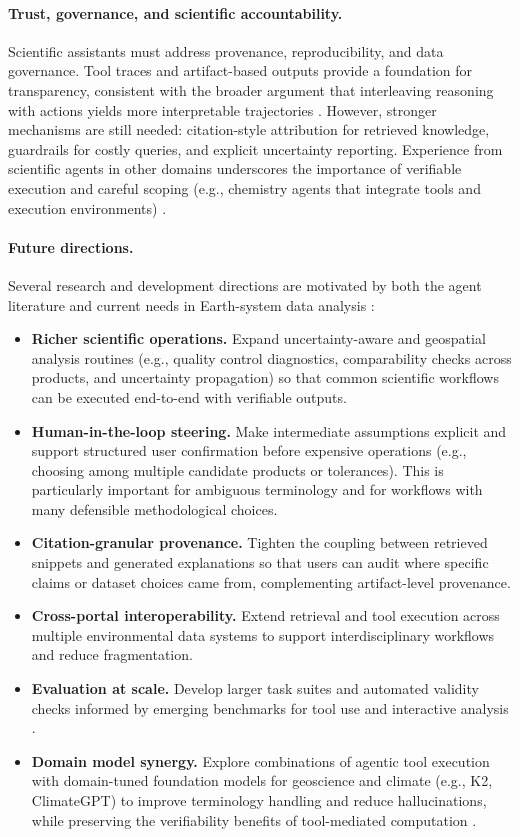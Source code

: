 \paragraph{Trust, governance, and scientific accountability.}
Scientific assistants must address provenance, reproducibility, and data governance.
Tool traces and artifact-based outputs provide a foundation for transparency, consistent with the broader argument that interleaving reasoning with actions yields more interpretable trajectories \citep{Yao2022ReAct}.
However, stronger mechanisms are still needed: citation-style attribution for retrieved knowledge, guardrails for costly queries, and explicit uncertainty reporting.
Experience from scientific agents in other domains underscores the importance of verifiable execution and careful scoping (e.g., chemistry agents that integrate tools and execution environments) \citep{Bran2024ChemCrow,Boiko2023Coscientist}.

\paragraph{Future directions.}
Several research and development directions are motivated by both the agent literature \citep{Luo2025LLMAgentSurvey} and current needs in Earth-system data analysis \citep{Zhao2024AIforGeoscience}:
\begin{itemize}[leftmargin=*]
  \item \textbf{Richer scientific operations.} Expand uncertainty-aware and geospatial analysis routines (e.g., quality control diagnostics, comparability checks across products, and uncertainty propagation) so that common scientific workflows can be executed end-to-end with verifiable outputs.
  \item \textbf{Human-in-the-loop steering.} Make intermediate assumptions explicit and support structured user confirmation before expensive operations (e.g., choosing among multiple candidate products or tolerances). This is particularly important for ambiguous terminology and for workflows with many defensible methodological choices.
  \item \textbf{Citation-granular provenance.} Tighten the coupling between retrieved snippets and generated explanations so that users can audit where specific claims or dataset choices came from, complementing artifact-level provenance.
  \item \textbf{Cross-portal interoperability.} Extend retrieval and tool execution across multiple environmental data systems to support interdisciplinary workflows and reduce fragmentation.
  \item \textbf{Evaluation at scale.} Develop larger task suites and automated validity checks informed by emerging benchmarks for tool use and interactive analysis \citep{Qin2023ToolLLM,Guo2024StableToolBench,Zhang2024DSEval,Li2025IDABench}.
  \item \textbf{Domain model synergy.} Explore combinations of agentic tool execution with domain-tuned foundation models for geoscience and climate (e.g., K2, ClimateGPT) to improve terminology handling and reduce hallucinations, while preserving the verifiability benefits of tool-mediated computation \citep{Deng2023K2,Thulke2024ClimateGPT}.
\end{itemize}
